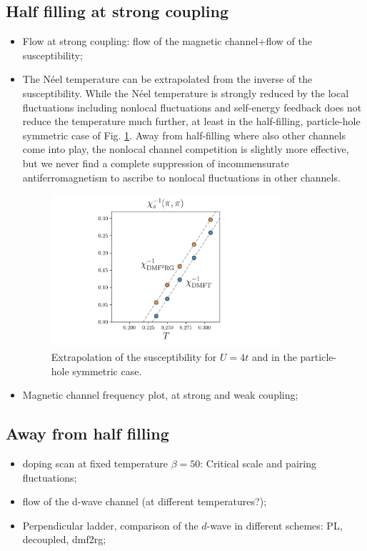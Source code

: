 \documentclass[paper=a4, fontsize=11pt]{scrartcl} %
\numberwithin{equation}{section} %
\numberwithin{figure}{section} %
\numberwithin{table}{section} %
\begin{document}
\subsection{Half filling at strong coupling} 
\begin{itemize}
\item Flow at strong coupling: flow of the magnetic channel+flow of the susceptibility; 
\item The N\' eel temperature can be extrapolated from the inverse of the susceptibility. 
While the N\' eel temperature is strongly reduced by the local fluctuations including nonlocal fluctuations and self-energy feedback does not reduce the temperature much further, at least in the half-filling, particle-hole symmetric case of Fig. \ref{fig:extrasusc}. Away from half-filling where also other channels come into play, the nonlocal channel competition is slightly more effective, but we never find a complete suppression of incommensurate antiferromagnetism to ascribe to nonlocal fluctuations in other channels. 
\begin{figure}[t!]
\begin{center}
\includegraphics[width=0.8\textwidth]{plots/extrapolate_susc.png}
\caption{Extrapolation of the susceptibility for $U=4t$ and in the particle-hole symmetric case.} 
\label{fig:extrasusc} 
\end{center}
\end{figure}


\item Magnetic channel frequency plot, at strong and weak coupling; 
\end{itemize} 
\subsection{Away from half filling}
\begin{itemize}
\item doping scan at fixed temperature $\beta=50$: Critical scale and pairing fluctuations; 
\item flow of the d-wave channel (at different temperatures?); 
\item Perpendicular ladder, comparison of the $d$-wave in different schemes: PL, decoupled, dmf2rg; 
\end{itemize}  
\end{document}
